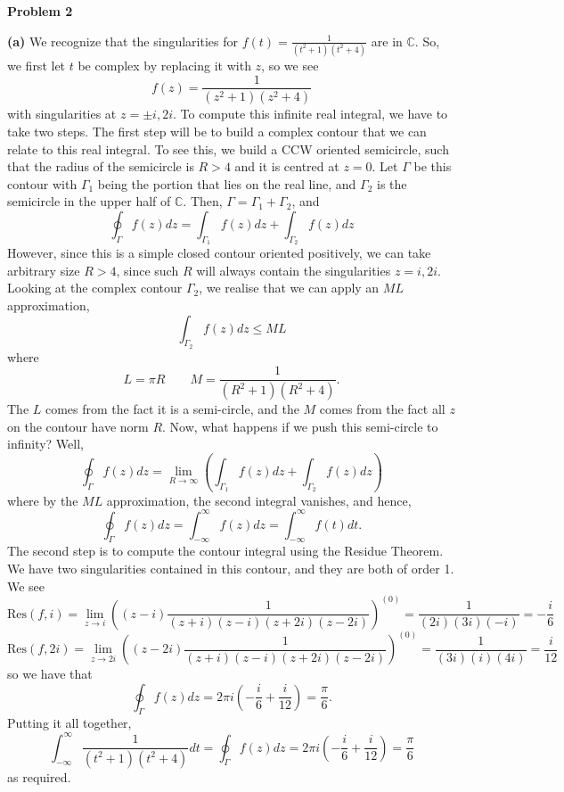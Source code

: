 \documentclass[10pt]{article}
\newcommand{\C}{\mathbb{C}}
\begin{document}
\textbf{Problem 2}

\textbf{(a)}
We recognize that the singularities for $f(t) = \frac{1}{(t^{2} + 1)(t^{2} + 4)}$ are in $\C$. So, we first let $t$ be complex by replacing it with $z$, so we see
$$f(z) = \frac{1}{(z^{2} + 1)(z^{2} + 4)}$$
with singularities at $z = \pm i, 2i$. To compute this infinite real integral, we have to take two steps. The first step will be to build a complex contour that we can relate to this real integral. To see this, we build a CCW oriented semicircle, such that the radius of the semicircle is $R > 4$ and it is centred at $z=0$. Let $\Gamma$ be this contour with $\Gamma_{1}$ being the portion that lies on the real line, and $\Gamma_{2}$ is the semicircle in the upper half of $\C$. Then, $\Gamma = \Gamma_{1} + \Gamma_{2}$, and
$$\oint_{\Gamma}f(z)dz = \int_{\Gamma_{1}}f(z)dz + \int_{\Gamma_{2}}f(z)dz$$
However, since this is a simple closed contour oriented positively, we can take arbitrary size $R>4$, since such $R$ will always contain the singularities $z= i, 2i$. Looking at the complex contour $\Gamma_{2}$, we realise that we can apply an $ML$ approximation,
$$\int_{\Gamma_{2}}f(z)dz \leq ML$$
where
$$ L = \pi R \hspace{2em} M = \frac{1}{(R^{2} + 1)(R^{2} + 4)}.$$
The $L$ comes from the fact it is a semi-circle, and the $M$ comes from the fact all $z$ on the contour have norm $R$. Now, what happens if we push this semi-circle to infinity? Well,
$$\oint_{\Gamma}f(z)dz = \lim_{R\to \infty}\left( \int_{\Gamma_{1}}f(z)dz + \int_{\Gamma_{2}}f(z)dz\right)$$
where by the $ML$ approximation, the second integral vanishes, and hence,
$$\oint_{\Gamma}f(z)dz = \int_{-\infty}^{\infty}f(z)dz = \int_{-\infty}^{\infty}f(t)dt.$$
The second step is to compute the contour integral using the Residue Theorem. We have two singularities contained in this contour, and they are both of order 1. We see
$$\text{Res}(f,i) = \lim_{z\to i}\left((z-i)\frac{1}{(z + i)(z - i)(z +2i)(z-2i)}\right)^{(0)} = \frac{1}{(2i)(3i)(-i)} = -\frac{i}{6}$$
$$\text{Res}(f,2i) = \lim_{z\to 2i}\left((z-2i)\frac{1}{(z + i)(z - i)(z +2i)(z-2i)}\right)^{(0)} = \frac{1}{(3i)(i)(4i)} = \frac{i}{12}$$
so we have that
$$\oint_{\Gamma}f(z)dz = 2\pi i\left(-\frac{i}{6} + \frac{i}{12}\right)= \frac{\pi}{6}.$$
Putting it all together,
$$\int_{-\infty}^{\infty}\frac{1}{(t^{2} + 1)(t^{2} + 4)}dt = \oint_{\Gamma}f(z)dz = 2\pi i\left(-\frac{i}{6} + \frac{i}{12}\right)= \frac{\pi}{6}$$
as required.
\end{document}
